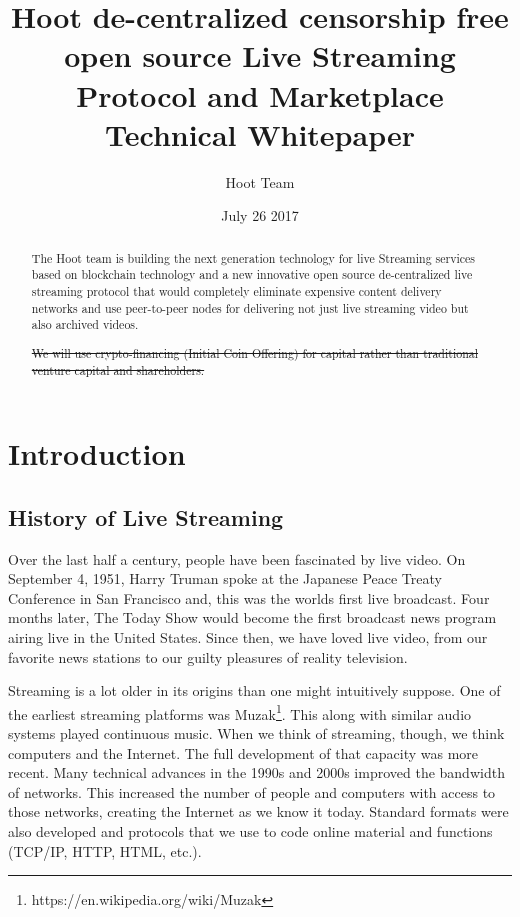 \documentclass{article}
\title{Hoot de-centralized censorship free open source Live Streaming Protocol and Marketplace Technical Whitepaper}
\author{Hoot Team}
\date{July 26 2017}
\begin{document}
\maketitle

\begin{abstract}
The Hoot team is building the next generation technology for live
Streaming services based on blockchain technology and a new
innovative open source de-centralized live streaming protocol that would completely eliminate expensive content delivery networks and use peer-to-peer nodes for delivering not just live streaming video but also archived videos.

\sout{We will use crypto-financing (Initial Coin Offering) for capital rather than traditional venture capital and shareholders.}

\end{abstract}
\newpage

\tableofcontents
\newpage

\section{Introduction}
\subsection{History of Live Streaming}
Over the last half a century, people have been fascinated by live video. On September 4, 1951, Harry Truman spoke at the Japanese Peace Treaty Conference in San Francisco and, this was the worlds first live broadcast. Four months later, The Today Show would become the first broadcast news program airing live in the United States. Since then, we have loved live video, from our favorite news stations to our guilty pleasures of reality television.

Streaming is a lot older in its origins than one might intuitively suppose. One of the earliest streaming platforms was Muzak\footnote{https://en.wikipedia.org/wiki/Muzak}. This along with similar audio systems played continuous music. When we think of streaming, though, we think computers and the Internet. The full development of that capacity was more recent. Many technical advances in the 1990s and 2000s improved the bandwidth of networks. This increased the number of people and computers with access to those networks, creating the Internet as we know it today. Standard formats were also developed and protocols that we use to code online material and functions (TCP/IP, HTTP, HTML, etc.).
\end{document}
